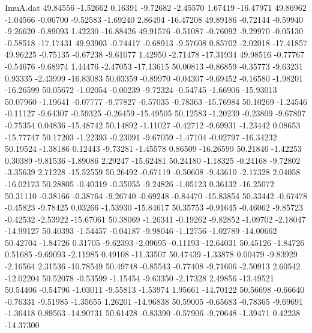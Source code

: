 \begin{filecontents}{ImuA.dat}
  49.84556   -1.52662    0.16391   -9.72682   -2.45570    1.67419  -16.47971
  49.86962   -1.04566   -0.06700   -9.52583   -1.69240    2.86494  -16.47208
  49.89186   -0.72144   -0.59940   -9.26620   -0.89093    1.42230  -16.88426
  49.91576   -0.51087   -0.76092   -9.29970   -0.05130   -0.58518  -17.17431
  49.93903   -0.74417   -0.68913   -9.57608    0.85702   -2.02018  -17.41857
  49.96225   -0.75135   -0.67238   -9.61077    1.42950   -2.71478  -17.31934
  49.98516   -0.77767   -0.54676   -9.68974    1.44476   -2.47053  -17.13615
  50.00813   -0.86859   -0.35773   -9.63231    0.93335   -2.43999  -16.83083
  50.03359   -0.89970   -0.04307   -9.69452   -0.16580   -1.98201  -16.26599
  50.05672   -1.02054   -0.00239   -9.72324   -0.54745   -1.66906  -15.93013
  50.07960   -1.19641   -0.07777   -9.77827   -0.57035   -0.78363  -15.76984
  50.10269   -1.24546   -0.11127   -9.64307   -0.59325   -0.26459  -15.49505
  50.12583   -1.20239   -0.23809   -9.67897   -0.75354    0.04836  -15.48742
  50.14892   -1.11027   -0.42712   -9.69931   -1.23442    0.08653  -15.77747
  50.17203   -1.22393   -0.23091   -9.67059   -1.47104   -0.02797  -16.34232
  50.19524   -1.38186    0.12443   -9.73281   -1.45578    0.86509  -16.26599
  50.21846   -1.42253    0.30389   -9.81536   -1.89086    2.29247  -15.62481
  50.24180   -1.18325   -0.24168   -9.72802   -3.35639    2.71228  -15.52559
  50.26492   -0.67119   -0.50608   -9.43610   -2.17328    2.04058  -16.02173
  50.28805   -0.40319   -0.35055   -9.24826   -1.05123    0.36132  -16.25072
  50.31110   -0.38166   -0.38764   -9.26740   -0.69248   -0.84470  -15.83854
  50.33442   -0.67478   -0.45823   -9.78425    0.03266   -1.53930  -15.84617
  50.35753   -0.91645   -0.46062   -9.85723   -0.42532   -2.53922  -15.67061
  50.38069   -1.26341   -0.19262   -9.82852   -1.09702   -2.18047  -14.99127
  50.40393   -1.54457   -0.04187   -9.98046   -1.12756   -1.02789  -14.00662
  50.42704   -1.84726    0.31705   -9.62393   -2.09695   -0.11193  -12.64031
  50.45126   -1.84726    0.51685   -9.69093   -2.11985    0.49108  -11.33507
  50.47439   -1.33878    0.00479   -9.83929   -2.16564    2.31536  -10.78549
  50.49748   -0.85543   -0.77408   -9.71606   -2.50913    2.60542  -12.02204
  50.52078   -0.53599   -1.15454   -9.63350   -2.17328    2.49856  -13.49521
  50.54406   -0.54796   -1.03011   -9.55813   -1.53974    1.95661  -14.70122
  50.56698   -0.66640   -0.76331   -9.51985   -1.35655    1.26201  -14.96838
  50.59005   -0.65683   -0.78365   -9.69691   -1.36418    0.89563  -14.90731
  50.61428   -0.83390   -0.57906   -9.70648   -1.39471    0.42238  -14.37300

\end{filecontents}
